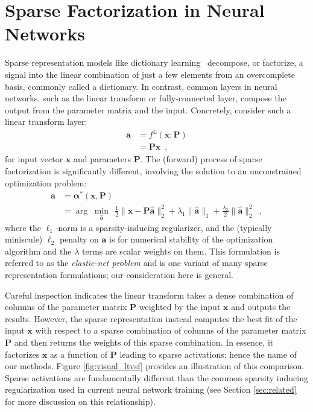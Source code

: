 \documentclass[10pt,twocolumn,letterpaper]{article}
\newcommand{\argmnmz}[1][]{\ensuremath{\arg\;\underset{#1}{\min}\:\:}}
\renewcommand{\vec}{\mathbf}
\newcommand{\x}{\vec{x}}
\renewcommand{\P}{\vec{P}}
\renewcommand{\a}{\vec{a}}
\newcommand{\balpha}{\boldsymbol{\alpha}}
\begin{document}
\section{Sparse Factorization in Neural Networks}
\label{sec:sparsemain}


Sparse representation models like dictionary learning~\cite{ElBOOK2010} decompose, or 
factorize, a signal into the linear combination of just a few elements from an 
overcomplete basis, commonly called a dictionary.  In contrast, common layers 
in neural networks, such as the linear transform or fully-connected layer, 
compose the output from the parameter matrix and the input.  Concretely, 
consider such a linear transform layer: 
\begin{align}
    \a & = f^{\text{L}}(\x;\P) \nonumber\\
       & = \P\x \enspace,
\end{align}
\noindent for input vector $\x$ and parameters $\P$.  
The (forward) process of sparse factorization is significantly different, involving the solution to an unconstrained optimization problem:
\begin{align}
    \a & = \balpha^*(\x,\P)
\label{eq:sp_coding}
    \\ 
    & = \argmnmz[\hat{\a}] \frac{1}{2}  \lVert \x-\P\hat{\a}\rVert_2^2 +
      \lambda_1\lVert\hat{\a}\rVert_1+\frac{\lambda_2}{2}\lVert\hat{\a}\rVert_2^2
\enspace, \nonumber
\end{align}
\noindent 
where the $\ell_1$-norm is a sparsity-inducing regularizer, and the (typically miniscule) $\ell_2$ penalty on $\a$ is for numerical stability of the optimization algorithm and the $\lambda$ terms are scalar weights on them.    This formulation is referred to as the \textit{elastic-net problem} \cite{ZoHaJRSS2005} and is one variant of many sparse representation formulations; our consideration here is general. 

Careful inspection indicates the linear transform takes a dense combination of columns of the parameter matrix $\P$ weighted by the input $\x$ and outputs the results.  However, the sparse representation instead computes the best fit of the input $\x$ with respect to a sparse combination of columns of the parameter matrix $\P$ and then returns the weights of this sparse combination.  In essence, it factorizes $\x$ as a function of $\P$ leading to sparse activations; hence the name of our methods.  
Figure \ref{fig:visual_ltvsf} provides an illustration of this comparison.  
Sparse activations are fundamentally different than the common sparsity inducing regularization used in current neural network training (see Section \ref{sec:related} for more discussion on this relationship).
\end{document}
